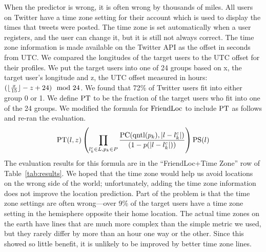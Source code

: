

\ifdefined\THESIS
{}
When the predictor is wrong, it is often wrong by thousands of miles.
%
All users on Twitter have a time zone setting for their account which is used
to display the times that tweets were posted.
%
The time zone is set automatically when a user registers, and the user can
change it, but it is still not always correct.
%
The time zone information is made available on the Twitter API as the offset
in seconds from UTC.
%
We compared the longitudes of the target users to the UTC offset for their
profiles.
%
We put the target users into one of 24 groups based on x, the target user's
longitude and z, the UTC offset measured in hours:
${(\lfloor {x\over15}\rfloor-z+24)\mod{24}}$.
%
We found that 72\% of Twitter users fit into either group 0 or 1.
%
We define $\operatorname{PT}$ to be the fraction of the target users who fit into one
of the 24 groups.
%
We modified the formula for $\operatorname{FriendLoc}$ to include $\operatorname{PT}$ as follows and
re-ran the evaluation.
\[
    \operatorname{PT}(l,z)
    \left(
        \prod_{l^c_k \in L,p_k \in P}
        {\operatorname{PC}(\operatorname{qntl}(p_k),|l-l^c_k|) \over (1-p(|l-l^c_k|))}
    \right)
    \operatorname{PS}(l)
\]
The evaluation results for this formula are in the ``FriendLoc+Time Zone'' row
of Table~\ref{tab:results}.
%
We hoped that the time zone would help us avoid locations on the wrong side of
the world; unfortunately, adding the time zone information does not improve the
location prediction.
%
Part of the problem is that the time zone settings are often wrong---over 9\% of
the target users have a time zone setting in the hemisphere opposite their home
location.
%
The actual time zones on the earth have lines that are much more complex than
the simple metric we used, but they rarely differ by more than an hour one way
or the other.
%
Since this showed so little benefit, it is unlikely to be improved by better
time zone lines.
\fi

